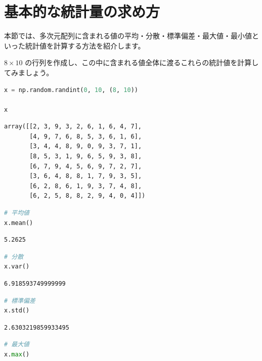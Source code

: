 \section{基本的な統計量の求め方}


本節では、多次元配列に含まれる値の平均・分散・標準偏差・最大値・最小値といった統計値を計算する方法を紹介します。

$8 \times 10$ の行列を作成し、この中に含まれる値全体に渡るこれらの統計値を計算してみましょう。


\begin{lstlisting}[style=codecell,language=Python]
x = np.random.randint(0, 10, (8, 10))

x
\end{lstlisting}

\begin{lstlisting}[style=outputcell]
array([[2, 3, 9, 3, 2, 6, 1, 6, 4, 7],
       [4, 9, 7, 6, 8, 5, 3, 6, 1, 6],
       [3, 4, 4, 8, 9, 0, 9, 3, 7, 1],
       [8, 5, 3, 1, 9, 6, 5, 9, 3, 8],
       [6, 7, 9, 4, 5, 6, 9, 7, 2, 7],
       [3, 6, 4, 8, 8, 1, 7, 9, 3, 5],
       [6, 2, 8, 6, 1, 9, 3, 7, 4, 8],
       [6, 2, 5, 8, 8, 2, 9, 4, 0, 4]])
\end{lstlisting}

\begin{lstlisting}[style=codecell,language=Python]
# 平均値
x.mean()
\end{lstlisting}

\begin{lstlisting}[style=outputcell]
5.2625
\end{lstlisting}

\begin{lstlisting}[style=codecell,language=Python]
# 分散
x.var()
\end{lstlisting}

\begin{lstlisting}[style=outputcell]
6.918593749999999
\end{lstlisting}

\begin{lstlisting}[style=codecell,language=Python]
# 標準偏差
x.std()
\end{lstlisting}

\begin{lstlisting}[style=outputcell]
2.6303219859933495
\end{lstlisting}

\begin{lstlisting}[style=codecell,language=Python]
# 最大値
x.max()
\end{lstlisting}

